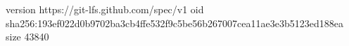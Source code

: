 version https://git-lfs.github.com/spec/v1
oid sha256:193ef022d0b9702ba3cb4ffe532f9c5be56b267007cea11ae3e3b5123ed188ea
size 43840
